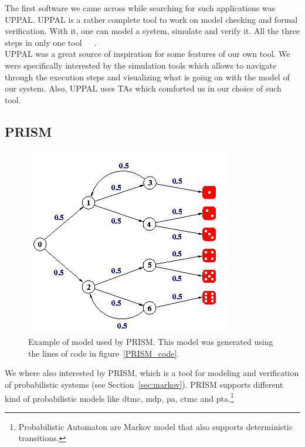 \documentclass[12pt]{article}
\theoremstyle{definition}
\theoremstyle{definition}
\theoremstyle{remark}
\begin{document}
The first software we came across while searching for such applications was UPPAL. UPPAL is a rather complete tool to work on model checking and formal verification. With it, one can model a system, simulate and verify it. All the three steps in only one tool~\cite{Bengtsson1996}~\cite{Behrmann2004}~\cite{Larsen1997}.\\

UPPAL was a great source of inspiration for some features of our own tool. We were specifically interested by the simulation tools which allows to navigate through the execution steps and visualizing what is going on with the model of our system. Also, UPPAL uses TAs which comforted us in our choice of such tool.\\


\subsection{PRISM}

\begin{figure}
    \centering
    \includegraphics[scale=0.6]{PRISM_model.png}
    \caption{Example of model used by PRISM. This model was generated using the lines of code in figure~\ref{PRISM_code}.}
    \label{PRISM_model}
\end{figure}

We where also interested by PRISM, which is a tool for modeling and verification of probabilistic systems (see Section~\ref{sec:markov}). PRISM supports different kind of probabilistic models like \gls{dtmc}, \gls{mdp}, \gls{pa}, \gls{ctmc} and \gls{pta}.\footnote{Probabilistic Automaton are Markov model that also supports deterministic transitions.}~\cite{Kwiatkowska2011}~\cite{Hinton2006}\\
\end{document}
